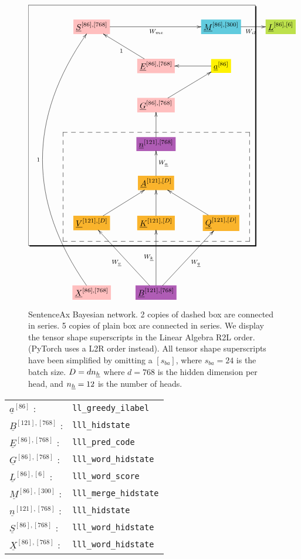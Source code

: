 \documentclass[12pt]{article}
\begin{document}
\begin{figure}[h!]\centering
$$\xymatrix@R=2.5pc@C=2.5pc{
&*+[F*:pink]{\underline{S}^{[86], [768]}}\ar[rr]_{W_{me}}&&*+[F*:SkyBlue]{\underline{M}^{[86], [300]}}\ar[r]_{W_{il}}&*+[F*:SpringGreen]{\underline{L}^{[86], [6]}}
\\
&&*+[F*:pink]{\underline{E}^{[86], [768]}}\ar[ul]^{1}&*+[F*:yellow]{\underline{a}^{[86]}}\ar[l]&
\\
&&*+[F*:pink]{\underline{G}^{[86], [768]}}\ar[ur]&&
\\
&&*+[F*:Orchid]{\underline{n}^{[121], [768]}}\ar[u]&&
\\
&&*+[F*:Dandelion]{\underline{A}^{[121], [D]}}\ar[u]_{W_\rva}&&
\\
&*+[F*:Dandelion]{\underline{V}^{[121], [D]}}\ar[ur]&*+[F*:Dandelion]{\underline{K}^{[121], [D]}}\ar[u]&*+[F*:Dandelion]{\underline{Q}^{[121], [D]}}\ar[ul]&
\\
&&&&
\\
&*+[F*:pink]{\underline{X}^{[86], [768]}}\ar@/^5pc/[uuuuuuu]^{1}&*+[F*:Orchid]{\underline{B}^{[121], [768]}}\ar[uu]^{W_\rvk}\ar[uur]_{W_\rvq}\ar[uul]^{W_\rvv}&&
\save
\POS"1,1"."6,1"."1,4"."6,4"!C*+<3.5em>\frm{-,}
\POS"4,2"."6,2"."4,4"."6,4"!C*+<2.5em>\frm{--}
\restore
}$$
\caption{SentenceAx Bayesian network. 2 copies of dashed box are connected in series. 5 copies of plain box are connected in series. We display the tensor shape superscripts in the Linear Algebra R2L order. (PyTorch uses a L2R order instead). All tensor shape superscripts have been simplified by omitting a $[s_{ba}]$, where $s_{ba}=24$ is the batch size. $D= d n_{\underline{h}}$ where $d=768$ is the hidden dimension per head, and $n_{\underline{h}}=12$ is the number of heads. }
\label{fig-texnn-for-sentence-ax-bnet}
\end{figure}

\begin{tabular}{ll}
$\underline{a}^{[86]}$ :&{\tt ll\_greedy\_ilabel}\\
$\underline{B}^{[121], [768]}$ :&{\tt lll\_hidstate}\\
$\underline{E}^{[86], [768]}$ :&{\tt lll\_pred\_code}\\
$\underline{G}^{[86], [768]}$ :&{\tt lll\_word\_hidstate}\\
$\underline{L}^{[86], [6]}$ :&{\tt lll\_word\_score}\\
$\underline{M}^{[86], [300]}$ :&{\tt lll\_merge\_hidstate}\\
$\underline{n}^{[121], [768]}$ :&{\tt lll\_hidstate}\\
$\underline{S}^{[86], [768]}$ :&{\tt lll\_word\_hidstate}\\
$\underline{X}^{[86], [768]}$ :&{\tt lll\_word\_hidstate}
\end{tabular}
\end{document}
